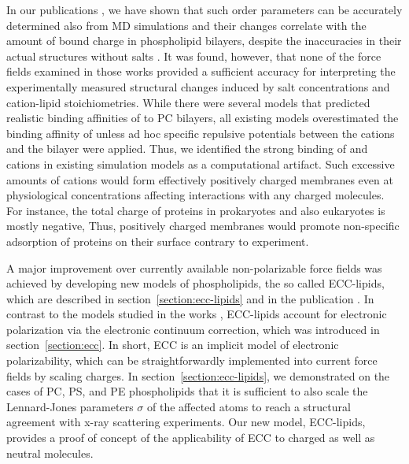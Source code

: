In our publications \citep{catte16, nmrlipids_proj4},
we have shown that such order parameters can be accurately determined also from MD simulations
and their changes correlate with the amount of bound charge in phospholipid bilayers, 
despite the inaccuracies in their actual structures without salts \citep{botan15}. 
It was found, however, that
none of the force fields examined in those works 
provided a sufficient accuracy for interpreting 
the experimentally measured structural changes induced by salt concentrations
and cation-lipid stoichiometries. 
While there were several models
that predicted realistic binding affinities of  to PC bilayers,
all existing models overestimated the binding affinity of 
unless ad hoc specific repulsive potentials between the cations and the bilayer were applied. \citep{catte16, nmrlipids_proj4}
Thus,
we identified the strong binding of  and  cations
in existing simulation models as a computational artifact.  
Such excessive amounts of cations 
would form effectively positively charged membranes
even at physiological concentrations
affecting interactions with any charged molecules. 
For instance,
the total charge of proteins
in prokaryotes and also eukaryotes 
is mostly negative,
\citep{link1997identifying, link1997comparing, urquhart1998comparison, schwartz2001whole, knight2004global}
Thus,
positively charged membranes would promote non-specific adsorption of proteins on their surface 
contrary to experiment.  
\citep{junkova2016, lingwood2010lipid, sekerevs2015song} 


A major improvement over currently available non-polarizable force fields
was achieved by developing new models of phospholipids, 
the so called ECC-lipids,
which are described in section~\ref{section:ecc-lipids}
and in the publication \citep{melcr18}. 
In contrast to the models studied in the works \citep{catte16, nmrlipids_proj4},
ECC-lipids account for electronic polarization
via the electronic continuum correction,  
which was introduced in section~\ref{section:ecc}. 
In short, 
ECC is an implicit model of electronic polarizability,
which can be straightforwardly implemented into current force fields 
by scaling charges.  
In section~\ref{section:ecc-lipids},
we demonstrated on the cases of PC, PS, and PE phospholipids
that it is sufficient to also scale the Lennard-Jones parameters $\sigma$ of the affected atoms
to reach a structural agreement with x-ray scattering experiments. 
Our new model, ECC-lipids,
provides a proof of concept of the applicability of ECC
to charged as well as neutral molecules. 



